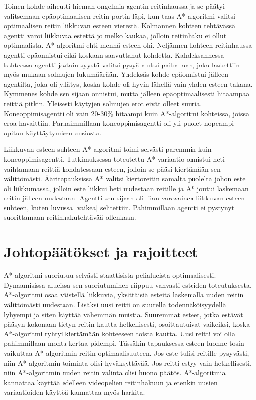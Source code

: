 \documentclass[utf8]{gradu3}
\begin{document}
Toinen kohde aiheutti hieman ongelmia agentin reitinhaussa ja se päätyi valitsemaan epäoptimaalisen reitin portin läpi, kun taas A*-algoritmi valitsi optimaalisen reitin liikkuvan esteen vierestä. Kolmannen kohteen tehtävässä agentti varoi liikkuvaa estettä jo melko kaukaa, jolloin reitinhaku ei ollut optimaalista. A*-algoritmi ehti mennä esteen ohi. Neljännen kohteen reitinhaussa agentti epäonnistui eikä koskaan saavuttanut kohdetta. Kahdeksannessa kohteessa agentti jostain syystä valitsi pysyä aluksi paikallaan, joka laskettiin myös mukaan solmujen lukumäärään. Yhdeksäs kohde epäonnistui jälleen agentilta, joka oli yllätys, koska kohde oli hyvin lähellä vain yhden esteen takana. Kymmenes kohde sen sijaan onnistui, mutta jälleen epäoptimaalisesti hitaampaa reittiä pitkin. Yleisesti käytyjen solmujen erot eivät olleet suuria. Koneoppimisagentti oli vain 20-30\% hitaampi kuin A*-algoritmi kohteissa, joissa eroa havaittiin. Parhaimmillaan koneoppimisagentti oli yli puolet nopeampi opitun käyttäytymisen ansiosta.

Liikkuvan esteen suhteen A*-algoritmi toimi selvästi paremmin kuin koneoppimisagentti. Tutkimuksessa toteutettu A* variaatio onnistui heti vaihtamaan reittiä kohdatessaan esteen, jolloin se pääsi kiertämään sen välittömästi. Ääritapauksissa A* valitsi kiertoreitin samalta puolelta johon este oli liikkumassa, jolloin este liikkui heti uudestaan reitille ja A* joutui laskemaan reitin jälleen uudestaan. Agentti sen sijaan oli liian varovainen liikkuvan esteen suhteen, kuten luvussa \ref{vaikea} selitettiin. Pahimmillaan agentti ei pystynyt suorittamaan reitinhakutehtävää ollenkaan.

\section{Johtopäätökset ja rajoitteet}
\label{johtop}

A*-algoritmi suoriutuu selvästi staattisista pelialueista optimaalisesti. Dynaamisissa alueissa sen suoriutuminen riippuu vahvasti esteiden toteutuksesta. A*-algoritmi osaa väistellä liikkuvia, yksittäisiä esteitä laskemalla uuden reitin välittömästi uudestaan. Lisäksi uusi reitti on suurella todennäköisyydellä lyhyempi ja siten käyttää vähemmän muistia. Suuremmat esteet, jotka estävät pääsyn kokonaan tietyn reitin kautta hetkellisesti, osoittautuivat vaikeiksi, koska A*-algoritmi ryhtyi kiertämään kohteeseen toista kautta. Uusi reitti voi olla pahimmillaan monta kertaa pidempi. Tässäkin tapauksessa esteen luonne tosin vaikuttaa A*-algoritmin reitin optimaalisuuteen. Jos este tulisi reitille pysyvästi, niin A*-algoritmin toiminta olisi hyväksyttävää. Jos reitti estyy vain hetkellisesti, niin A*-algoritmin uuden reitin valinta olisi huono päätös. A*-algoritmia kannattaa käyttää edelleen videopelien reitinhakuun ja etenkin uusien variaatioiden käyttöä kannattaa myös harkita.
\end{document}
